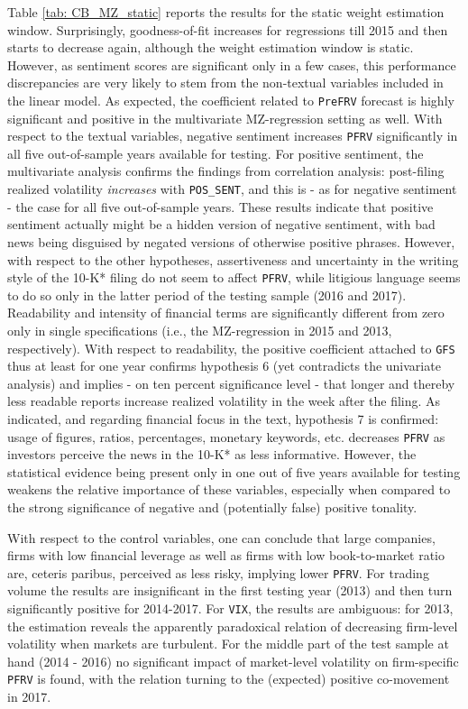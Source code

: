 Table \ref{tab: CB_MZ_static} reports the results for the static weight estimation window. Surprisingly, goodness-of-fit increases for regressions till 2015 and then starts to decrease again, although the weight estimation window is static. However, as sentiment scores are significant only in a few cases, this performance discrepancies are very likely to stem from the non-textual variables included in the linear model. As expected, the coefficient related to \texttt{PreFRV} forecast is highly significant and positive in the multivariate MZ-regression setting as well. With respect to the textual variables, negative sentiment increases \texttt{PFRV} significantly in all five out-of-sample years available for testing. For positive sentiment, the multivariate analysis confirms the findings from correlation analysis: post-filing realized volatility \textit{increases} with \texttt{POS\_SENT}, and this is - as for negative sentiment - the case for all five out-of-sample years. These results indicate that positive sentiment actually might be a hidden version of negative sentiment, with bad news being disguised by negated versions of otherwise positive phrases. However, with respect to the other hypotheses, assertiveness and uncertainty in the writing style of the 10-K* filing do not seem to affect \texttt{PFRV}, while litigious language seems to do so only in the latter period of the testing sample (2016 and 2017). Readability and intensity of financial terms are significantly different from zero only in single specifications (i.e., the MZ-regression in 2015 and 2013, respectively). With respect to readability, the positive coefficient attached to \texttt{GFS} thus at least for one year confirms hypothesis 6 (yet contradicts the univariate analysis) and implies - on ten percent significance level - that longer and thereby less readable reports increase realized volatility in the week after the filing. As indicated, and regarding financial focus in the text, hypothesis 7 is confirmed: usage of figures, ratios, percentages, monetary keywords, etc. decreases \texttt{PFRV} as investors perceive the news in the 10-K* as less informative. However, the statistical evidence being present only in one out of five years available for testing weakens the relative importance of these variables, especially when compared to the strong significance of negative and (potentially false) positive tonality.

With respect to the control variables, one can conclude that large companies, firms with low financial leverage  as well as firms with low book-to-market ratio are, ceteris paribus, perceived as less risky, implying lower \texttt{PFRV}. For trading volume the results are insignificant in the first testing year (2013) and then turn significantly positive for 2014-2017. For \texttt{VIX}, the results are ambiguous: for 2013, the estimation reveals the apparently paradoxical relation of decreasing firm-level volatility when markets are turbulent. For the middle part of the test sample at hand (2014 - 2016) no significant impact of market-level volatility on firm-specific \texttt{PFRV} is found, with the relation turning to the (expected) positive co-movement in 2017. 

